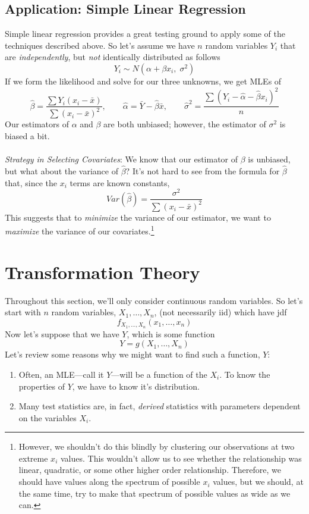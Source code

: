 \documentclass[a4paper,12pt]{scrartcl}
\begin{document}
\newpage
\subsection{Application: Simple Linear Regression}

Simple linear regression provides a great testing ground to apply
some of the techniques described above. So let's assume we have $n$
random variables $Y_i$ that are \emph{independently}, but 
\emph{not} identically distributed as follows
   \[ Y_i \sim N(\alpha + \beta x_i,\; \sigma^2) \]
If we form the likelihood and solve for our three unknowns, we get
MLEs of 
\[ \hat{\beta} = \frac{\sum Y_i (x_i - \bar{x})}{\sum (x_i-\bar{x})^2},
   \qquad \hat{\alpha}=\bar{Y} - \hat{\beta} \bar{x}, \qquad
   \hat{\sigma}^2 = \frac{\sum (Y_i - \hat{\alpha}-\hat{\beta}x_i)^2}{
   n}
   \]
Our estimators of $\alpha$ and $\beta$ are both unbiased; however,
the estimator of $\sigma^2$ is biased a bit.
\\
\\
{\sl Strategy in Selecting Covariates}: We know that our estimator
of $\beta$ is unbiased, but what about the variance of $\hat{\beta}$?
It's not hard to see from the formula for $\hat{\beta}$ that, since
the $x_i$ terms are known constants,
   \[ Var(\hat{\beta}) = \frac{\sigma^2}{\sum (x_i - \bar{x})^2} \]
This suggests that to \emph{minimize} the variance of our estimator, we
want to \emph{maximize} the variance of our covariates.\footnote{  
However, we shouldn't do this blindly by clustering our observations
at two extreme $x_i$ values. This wouldn't allow us to see
whether the relationship was linear, quadratic, or some other higher
order relationship. Therefore, we should have values along the 
spectrum of possible $x_i$ values, but we should, at the same time,
try to make that spectrum of possible values as wide as we can.}



\newpage
\section{Transformation Theory}

Throughout this section, we'll only consider continuous random 
variables. So let's start with $n$ random variables, $X_1, \ldots,
X_n$, (not necessarily iid) which have jdf
   \[ f_{X_1, \ldots, X_n}(x_1, \ldots, x_n) \]
Now let's suppose that we have $Y$, which is some function 
   \[ Y = g(X_1, \ldots, X_n) \]
Let's review some reasons why we might want to find such a function,
$Y$:
\begin{enumerate}
   \item Often, an MLE---call it $Y$---will be a function of the
      $X_i$. To know the properties of $Y$, we have to know it's
      distribution.
   \item Many test statistics are, in fact, \emph{derived} statistics
      with parameters dependent on the variables $X_i$.
\end{enumerate}
\end{document}
